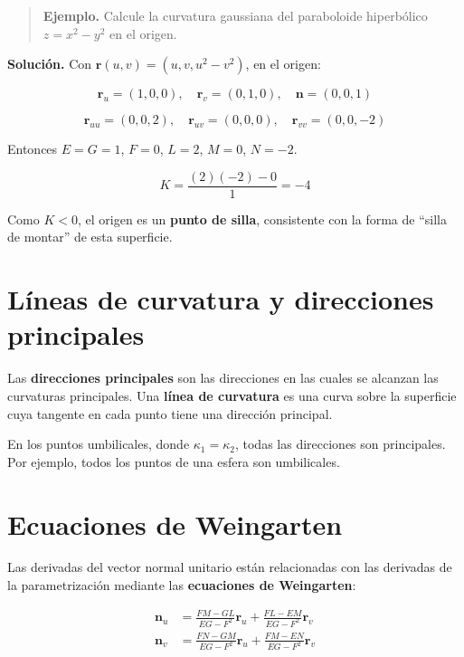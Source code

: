 \documentclass[
]{book}
\begin{document}
\begin{quote}
\textbf{Ejemplo.} Calcule la curvatura gaussiana del paraboloide hiperbólico \(z = x^2 - y^2\) en el origen.
\end{quote}

\textbf{Solución.} Con \(\mathbf{r}(u, v) = (u, v, u^2 - v^2)\), en el origen:

\[
\mathbf{r}_u = (1, 0, 0), \quad \mathbf{r}_v = (0, 1, 0), \quad \mathbf{n} = (0, 0, 1)
\]

\[
\mathbf{r}_{uu} = (0, 0, 2), \quad \mathbf{r}_{uv} = (0, 0, 0), \quad \mathbf{r}_{vv} = (0, 0, -2)
\]

Entonces \(E = G = 1\), \(F = 0\), \(L = 2\), \(M = 0\), \(N = -2\).

\[
K = \frac{(2)(-2) - 0}{1} = -4
\]

Como \(K < 0\), el origen es un \textbf{punto de silla}, consistente con la forma de ``silla de montar'' de esta superficie.

\section{Líneas de curvatura y direcciones principales}\label{luxedneas-de-curvatura-y-direcciones-principales}

Las \textbf{direcciones principales} son las direcciones en las cuales se alcanzan las curvaturas principales. Una \textbf{línea de curvatura} es una curva sobre la superficie cuya tangente en cada punto tiene una dirección principal.

En los puntos umbilicales, donde \(\kappa_1 = \kappa_2\), todas las direcciones son principales. Por ejemplo, todos los puntos de una esfera son umbilicales.

\section{Ecuaciones de Weingarten}\label{ecuaciones-de-weingarten}

Las derivadas del vector normal unitario están relacionadas con las derivadas de la parametrización mediante las \textbf{ecuaciones de Weingarten}:

\[
\begin{aligned}
\mathbf{n}_u &= \frac{FM - GL}{EG - F^2} \mathbf{r}_u + \frac{FL - EM}{EG - F^2} \mathbf{r}_v \\
\mathbf{n}_v &= \frac{FN - GM}{EG - F^2} \mathbf{r}_u + \frac{FM - EN}{EG - F^2} \mathbf{r}_v
\end{aligned}
\]
\end{document}
